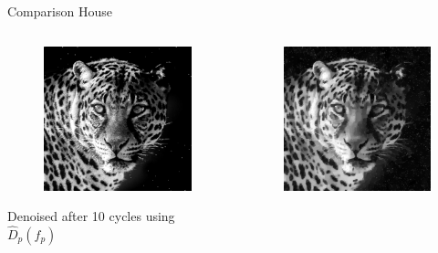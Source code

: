 \documentclass[mathserif]{beamer}
\begin{document}
\begin{frame}{Comparison House}
 \begin{columns}
        \begin{column}{.3\textwidth}
            \begin{figure}
                \centering
                \includegraphics[width=\textwidth]{../testimages/leopard/500_20percent/denoised_leopard_500_20percent_10_cycle.png}
            \end{figure}
                \centering
                Denoised after 10 cycles using $\hat D_p(f_p)$ 
        \end{column}
        \begin{column}{.3\textwidth}
            \begin{figure}
                \centering
                \includegraphics[width=\textwidth]{../testimages/leopard/v80_500_20/v80_bad_denoised_leopard_500_20percent_10_cycle.png}

\end{figure}
\end{column}
\end{columns}
\end{frame}
\end{document}
